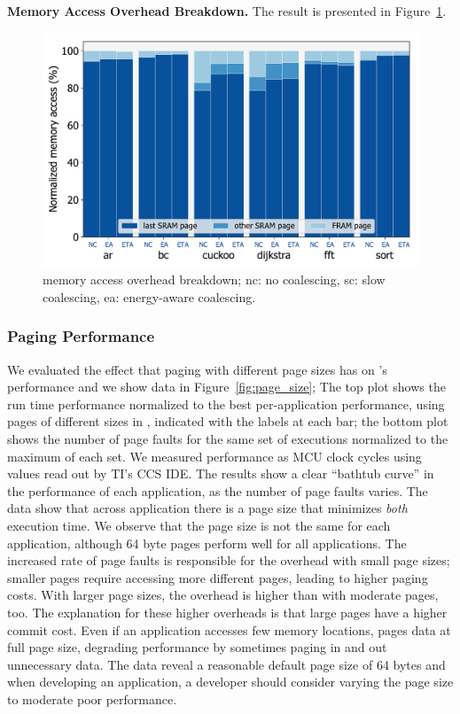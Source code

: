 \textbf{\sys Memory Access Overhead Breakdown.} The result is presented in Figure~\ref{fig:coalmemory}.

\begin{figure}
	\centering
	\includegraphics[width=\columnwidth]{figures/memAccess}
	\caption{\sys memory access overhead breakdown; nc: no coalescing, sc: slow coalescing, ea: energy-aware coalescing. }
	\label{fig:coalmemory}
\end{figure}

\subsubsection{\sys Paging Performance}
\label{sec:results_memory_management}

We evaluated the effect that paging with different page sizes has on \sys's performance and we show data in Figure~\ref{fig:page_size}; The top plot shows the run time performance normalized to the best per-application performance, using pages of different sizes in \sys, indicated with the labels at each bar; the bottom plot shows the number of page faults for the same set of executions normalized to the maximum of each set. We measured performance as MCU clock cycles using values read out by TI's CCS IDE. The results show a clear ``bathtub curve'' in the performance of each application, as the number of page faults varies. The data show that across application there is a page size that minimizes \emph{both} execution time. We observe that the page size is not the same for each application, although 64 byte pages perform well for all applications. The increased rate of page faults is responsible for the overhead with small page sizes; smaller pages require accessing more different pages, leading to higher paging costs. With larger page sizes, the overhead is higher than with moderate pages, too. The explanation for these higher overheads is that large pages have a higher commit cost. Even if an application accesses few memory locations, \sys pages data at full page size, degrading performance by sometimes paging in and out unnecessary data. The data reveal a reasonable default page size of 64 bytes and when developing an application, a developer should consider varying the page size to moderate poor performance.

